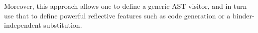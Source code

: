 \documentclass{article}
\begin{document}
\medskip
Moreover, this approach allows one to define a generic AST visitor, and in turn use that to define powerful reflective features such as code generation or a binder-independent substitution.  





\end{document}
